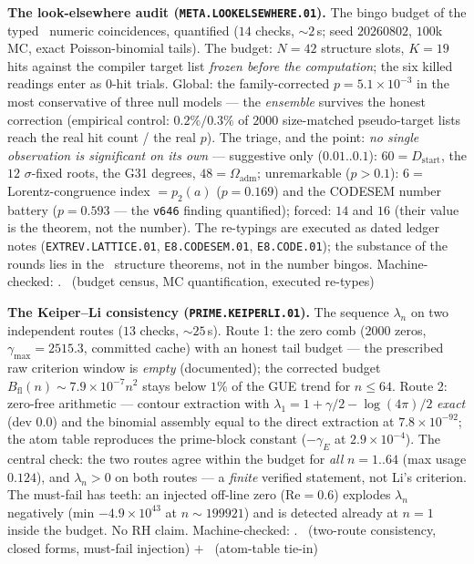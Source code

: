 \documentclass[11pt,a4paper]{article}
\theoremstyle{definition}
\begin{document}
\par\smallskip\noindent\textbf{The look-elsewhere audit
(\texttt{META.LOOKELSEWHERE.01}).}
The bingo budget of the typed \mC\ numeric coincidences, quantified
($14$ checks, ${\sim}2$\,s; seed $20260802$, $100$k MC, exact
Poisson-binomial tails).  The budget: $N=42$ structure slots, $K=19$
hits against the compiler target list \emph{frozen before the
computation}; the six killed readings enter as $0$-hit trials.
Global: the family-corrected $p=5.1\times10^{-3}$ in the most
conservative of three null models --- the \emph{ensemble} survives
the honest correction (empirical control: $0.2\%/0.3\%$ of $2000$
size-matched pseudo-target lists reach the real hit count / the real
$p$).  The triage, and the point: \emph{no single observation is
significant on its own} --- suggestive only ($0.01..0.1$):
$60=D_{\mathrm{start}}$, the $12$ $\sigma$-fixed roots, the G31
degrees, $48=\Omega_{\mathrm{adm}}$; unremarkable ($p>0.1$): $6=$
Lorentz-congruence index $=p_2(a)$ ($p=0.169$) and the CODESEM
number battery ($p=0.593$ --- the \texttt{v646} finding quantified);
forced: $14$ and $16$ (their value is the theorem, not the number).
The re-typings are executed as dated ledger notes
(\texttt{EXTREV.LATTICE.01}, \texttt{E8.CODESEM.01},
\texttt{E8.CODE.01}); the substance of the rounds lies in the \mE\
structure theorems, not in the number bingos.
Machine-checked: .
\mE\ (budget census, MC quantification, executed re-types)
\par\smallskip

\par\smallskip\noindent\textbf{The Keiper--Li consistency
(\texttt{PRIME.KEIPERLI.01}).}
The sequence $\lambda_n$ on two independent routes ($13$ checks,
${\sim}25$\,s).  Route 1: the zero comb ($2000$ zeros,
$\gamma_{\max}=2515.3$, committed cache) with an honest tail budget
--- the prescribed raw criterion window is \emph{empty}
(documented); the corrected budget $B_{\mathrm{fl}}(n)\sim
7.9\times10^{-7}n^2$ stays below $1\%$ of the GUE trend for
$n\le64$.  Route 2: zero-free arithmetic --- contour extraction with
$\lambda_1=1+\gamma/2-\log(4\pi)/2$ \emph{exact} (dev $0.0$) and the
binomial assembly equal to the direct extraction at
$7.8\times10^{-92}$; the atom table reproduces the prime-block
constant ($-\gamma_E$ at $2.9\times10^{-4}$).  The central check:
the two routes agree within the budget for \emph{all} $n=1..64$
(max usage $0.124$), and $\lambda_n>0$ on both routes --- a
\emph{finite} verified statement, not Li's criterion.  The must-fail
has teeth: an injected off-line zero ($\mathrm{Re}=0.6$) explodes
$\lambda_n$ negatively (min $-4.9\times10^{43}$ at
$n\sim199921$) and is detected already at $n=1$ inside the budget.
No RH claim.
Machine-checked: .
\mE\ (two-route consistency, closed forms, must-fail injection) $+$
\mC\ (atom-table tie-in)
\par\smallskip
\end{document}
